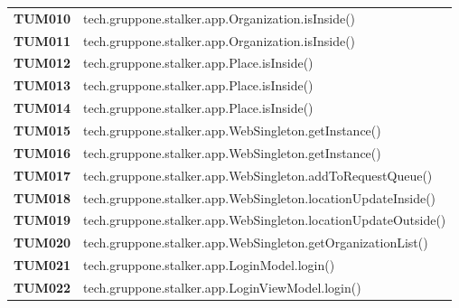 \documentclass[../../piano-di-qualifica.tex]{subfiles}
\begin{document}
\begin{longtable}[H]{>{\centering\bfseries}m{3cm} >{}m{13cm}}
  TUM010             & tech.gruppone.stalker.app.Organization.isInside\@()                                                     \\

  TUM011             & tech.gruppone.stalker.app.Organization.isInside\@()                                                     \\

  TUM012             & tech.gruppone.stalker.app.Place.isInside\@()                                                            \\

  TUM013             & tech.gruppone.stalker.app.Place.isInside\@()                                                            \\

  TUM014             & tech.gruppone.stalker.app.Place.isInside\@()                                                            \\

  TUM015             & tech.gruppone.stalker.app.WebSingleton.getInstance\@()                                                  \\

  TUM016             & tech.gruppone.stalker.app.WebSingleton.getInstance\@()                                                  \\

  TUM017             & tech.gruppone.stalker.app.WebSingleton.addToRequestQueue\@()                                            \\

  TUM018             & tech.gruppone.stalker.app.WebSingleton.locationUpdateInside\@()                                         \\

  TUM019             & tech.gruppone.stalker.app.WebSingleton.locationUpdateOutside\@()                                        \\

  TUM020             & tech.gruppone.stalker.app.WebSingleton.getOrganizationList\@()                                          \\


  TUM021             & tech.gruppone.stalker.app.LoginModel.login\@()                                                          \\

  TUM022             & tech.gruppone.stalker.app.LoginViewModel.login\@()                                                      \\


\end{longtable}
\end{document}
